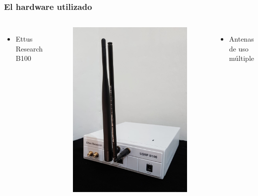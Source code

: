 \begin{frame}
\frametitle{El hardware utilizado}
\begin{columns}
		\begin{itemize}	
			\item {Ettus Research B100}
		\end{itemize}
		\begin{figure}
		\includegraphics[scale=0.10]{usrp_foto}
		\end{figure}
		\begin{itemize}	
			\item { Antenas de uso múltiple}

\end{itemize}
\end{columns}
\end{frame}
